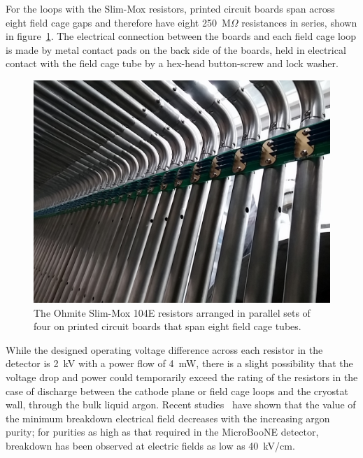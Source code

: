 
For the loops with the Slim-Mox resistors, printed circuit boards span across eight field cage gaps and therefore have eight 250~M$\Omega$ resistances in series, shown in figure~\ref{fig:tpc-voltage-divider-slimmox}. The electrical connection between the boards and each field cage loop is made by metal contact pads on the back side of the boards, held in electrical contact with the field cage tube by a hex-head button-screw and lock washer.

\begin{figure}
\centering	
\includegraphics[width=0.8\linewidth]{figures/tpc-voltage-divider-slimmox.jpg}
\caption{The Ohmite Slim-Mox 104E resistors arranged in parallel sets of four on printed circuit boards that span eight field cage tubes.}
\label{fig:tpc-voltage-divider-slimmox}
\end{figure}

While the designed operating voltage difference across each resistor in the detector is 2~kV with a power flow of 4~mW, there is a slight possibility that the voltage drop and power could temporarily exceed the rating of the resistors in the case of discharge between the cathode plane or field cage loops and the cryostat wall, through the bulk liquid argon. Recent studies~\cite{Acciarri:2014ica} have shown that the value of the minimum breakdown electrical field decreases with the increasing argon purity; for purities as high as that required in the MicroBooNE detector, breakdown has been observed at electric fields as low as 40~kV/cm.

